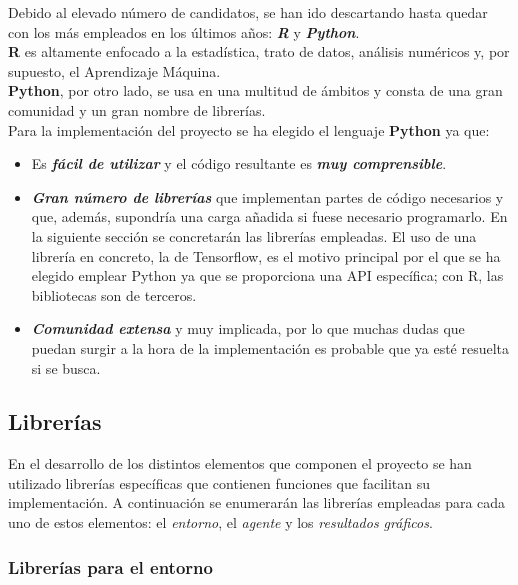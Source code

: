 Debido al elevado número de candidatos, se han ido descartando hasta quedar con los más empleados en los últimos años: \textbf{\textit{R}} y \textbf{\textit{Python}}. \\

\textbf{R} es altamente enfocado a la estadística, trato de datos, análisis numéricos y, por supuesto, el Aprendizaje Máquina. \\

\textbf{Python}, por otro lado, se usa en una multitud de ámbitos y consta de una gran comunidad y un gran nombre de librerías. \\

Para la implementación del proyecto se ha elegido el lenguaje \textbf{Python} ya que:

\begin{itemize}
    \item Es \textbf{\textit{fácil de utilizar}} y el código resultante es \textbf{\textit{muy comprensible}}.
    \item \textbf{\textit{Gran número de librerías}} que implementan partes de código necesarios y que, además, supondría una carga añadida si fuese necesario programarlo. En la siguiente sección se concretarán las librerías empleadas. El uso de una librería en concreto, la de Tensorflow, es el motivo principal por el que se ha elegido emplear Python ya que se proporciona una API específica; con R, las bibliotecas son de terceros. 
    \item \textbf{\textit{Comunidad extensa}} y muy implicada, por lo que muchas dudas que puedan surgir a la hora de la implementación es probable que ya esté resuelta si se busca.
\end{itemize}

\subsection{Librerías} 

En el desarrollo de los distintos elementos que componen el proyecto se han utilizado librerías específicas que contienen funciones que facilitan su implementación. A continuación se enumerarán las librerías empleadas para cada uno de estos elementos: el \textit{entorno}, el \textit{agente} y los \textit{resultados gráficos}. 

\subsubsection{Librerías para el entorno}

